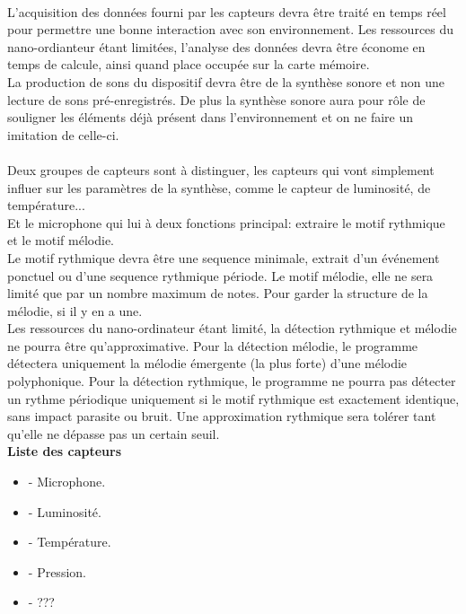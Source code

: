 \documentclass[a4paper, titlepage, oneside, 12pt]{article}%
\begin{document}
\paragraph{}
L’acquisition des données fourni par les capteurs devra être traité en temps réel pour permettre une bonne interaction avec son environnement. Les ressources du nano-ordianteur étant limitées, l'analyse des données devra être économe en temps de calcule, ainsi quand place occupée sur la carte mémoire.\\
La production de sons du dispositif devra être de la synthèse sonore et non une lecture de sons pré-enregistrés. De plus la synthèse sonore aura pour rôle de souligner les éléments déjà présent dans l’environnement et on ne faire un imitation de celle-ci.

\paragraph{}
Deux groupes de capteurs sont à distinguer, les capteurs qui vont simplement influer sur les paramètres de la synthèse, comme le capteur de luminosité, de température... \\
Et le microphone qui lui à deux fonctions principal: extraire le motif rythmique et le motif mélodie.\\
Le motif rythmique devra être une sequence minimale, extrait d'un événement ponctuel ou d'une sequence rythmique période.
Le motif mélodie, elle ne sera limité que par un nombre maximum de notes. Pour garder la structure de la mélodie, si il y en a une.\\

Les ressources du nano-ordinateur étant limité, la détection rythmique et mélodie ne pourra être qu'approximative. Pour la détection mélodie, le programme détectera uniquement la mélodie émergente (la plus forte) d'une mélodie polyphonique. Pour la détection rythmique, le programme ne pourra pas détecter un rythme périodique uniquement si le motif rythmique est exactement identique, sans impact parasite ou bruit. Une approximation rythmique sera tolérer tant qu'elle ne dépasse pas un certain seuil.\\

\hspace{-6mm}\textbf{Liste des capteurs}
\begin {itemize}
\item[-] Microphone.
\item[-] Luminosité.
\item[-] Température.
\item[-] Pression.
\item[-] ???
\end{itemize}
\end{document}
